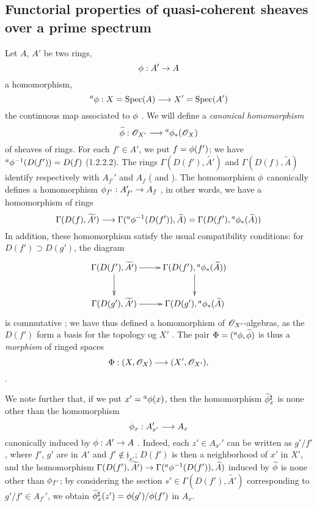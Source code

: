 \subsection{Functorial properties of quasi-coherent sheaves over a prime spectrum}
\label{subsection-func-qcoh-over-spec}

\begin{env}[1.6.1]
\label{1.1.6.1}
Let $A$, $A'$ be two rings,
\[
  \phi:A'\to A
\]
a homomorphism,
\[
  {}^a\phi:X={\mathop{\mathrm{Spec}}\nolimits}(A)\longrightarrow X'={\mathop{\mathrm{Spec}}\nolimits}(A')
\]
the continuous map associated to $\phi$ . We will define a {\em canonical
homomorphism}
\[
  \widetilde{\phi}:\mathscr{O}_{X'}\longrightarrow{}^a\phi_*(\mathscr{O}_X)
\]
of sheaves of rings. For each $f'\in A'$, we put $f=\phi(f')$; we have
${}^a\phi^{-1}(D(f'))=D(f)$ (1.2.2.2). The rings $\Gamma(D(f'),\widetilde{A'})$ and
$\Gamma(D(f),\widetilde{A})$ identify respectively with $A_{f'}'$ and $A_f$
( and ). The homomorphism $\phi$ canonically defines a
homomorphism $\phi_{f'}:A_{f'}'\to A_f$ , in other words, we have a
homomorphism of rings
\[
  \Gamma(D(f),\widetilde{A'})\longrightarrow\Gamma({}^a\phi^{-1}(D(f')),\widetilde{A})
  =\Gamma(D(f'),{}^a\phi_*(\widetilde{A}))
\]
In addition, these homomorphism satisfy the usual compatibility conditions: for
$D(f')\supset D(g')$, the diagram
\[
  \xymatrix{
    \Gamma(D(f'),\widetilde{A'})\ar[r]\ar[d] &
    \Gamma(D(f'),{}^a\vphi_*(\widetilde{A}))\ar[d]\\
    \Gamma(D(g'),\widetilde{A'})\ar[r] &
    \Gamma(D(g'),{}^a\vphi_*(\widetilde{A})
  }
\]
is commutative ; we have thus defined a homomorphism of $\mathscr{O}_{X'}$-algebras,
as the $D(f')$ form a basis for the topology og $X'$ . The pair
$\Phi=({}^a\phi,\widetilde{\phi})$ is thus a {\em morphism} of ringed spaces
\[
  \Phi:(X,\mathscr{O}_X)\longrightarrow(X',\mathscr{O}_{X'}),
\]
.

We note further that, if we put $x'={}^a\phi(x)$, then the homomorphism
$\widetilde{\phi}_x^\sharp$  is none other than the homomorphism
\[
  \phi_x:A_{x'}'\longrightarrow A_x
\]
canonically induced by $\phi:A'\to A$ . Indeed, each $z'\in A_{x'}'$
can be written as $g'/f'$, where $f'$, $g'$ are in $A'$ and $f'\not\in\mathfrak{j}_{x'}$;
$D(f')$ is then a neighborhood of $x'$ in $X'$, and the homomorphism
$\Gamma(D(f'),\widetilde{A'})\to\Gamma({}^a\phi^{-1}(D(f')),\widetilde{A})$ induced by
$\widetilde{\phi}$ is none other than $\phi_{f'}$; by considering the section
$s'\in\Gamma(D(f'),\widetilde{A'})$ corresponding to $g'/f'\in A_{f'}'$, we obtain
$\widetilde{\phi}_x^\sharp(z')=\phi(g')/\phi(f')$ in $A_x$.
\end{env}

